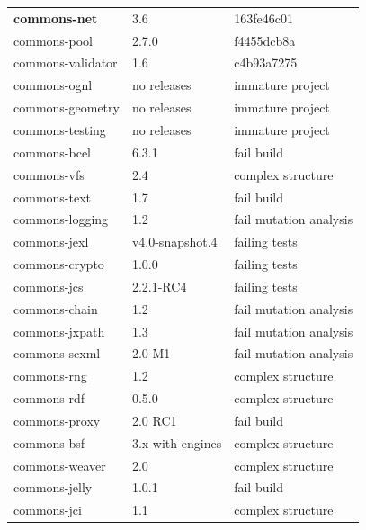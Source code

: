 \documentclass[sigconf]{acmart}
\begin{document}
\begin{table}[t]
\begin{tabular}{|l|l|l| }
\rowcolor{yellow}
    \textbf{commons-net}           & 3.6            	& 163fe46c01\\ 
    commons-pool          & 2.7.0          		& f4455dcb8a\\ 
\rowcolor{yellow}
    commons-validator     & 1.6            		& c4b93a7275\\ 
    \hline
    \hline 
    commons-ognl          & no releases    & immature project \\
\rowcolor{yellow}
    commons-geometry      & no releases    & immature project \\
    commons-testing       & no releases    & immature project \\
\rowcolor{yellow}
    commons-bcel          & 6.3.1           & fail build \\
    commons-vfs           & 2.4             & complex structure \\ 
\rowcolor{yellow}
    commons-text          & 1.7             & fail build \\ 
    commons-logging       & 1.2             & fail mutation analysis \\ 
\rowcolor{yellow}
    commons-jexl          & v4.0-snapshot.4 & failing tests \\
    commons-crypto        & 1.0.0           & failing tests \\
\rowcolor{yellow}
    commons-jcs           & 2.2.1-RC4       & failing tests \\
    commons-chain         & 1.2             & fail mutation analysis \\ 
\rowcolor{yellow}
    commons-jxpath        & 1.3             & fail mutation analysis \\ 
    commons-scxml         & 2.0-M1          & fail mutation analysis \\ 
\rowcolor{yellow}
    commons-rng           & 1.2             & complex structure \\ 
    commons-rdf           & 0.5.0           & complex structure \\ 
\rowcolor{yellow}
    commons-proxy         & 2.0 RC1         & fail build \\ 
    commons-bsf           & 3.x-with-engines & complex structure \\ 
\rowcolor{yellow}
    commons-weaver        & 2.0             & complex structure \\ 
    commons-jelly         & 1.0.1           & fail build \\
\rowcolor{yellow}
    commons-jci           & 1.1             & complex structure \\ 
    \hline
\end{tabular}
\label{tbl:fullsubjects}
\end{table}
\end{document}
